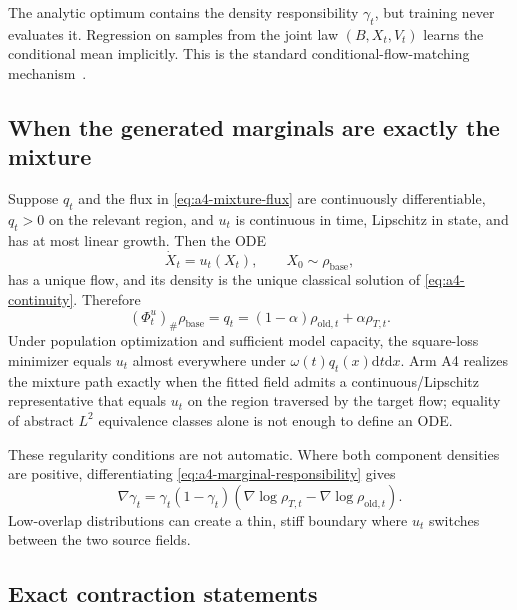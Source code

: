 \documentclass[11pt,a4paper]{article}
\newcommand{\dd}{\mathrm{d}}
\theoremstyle{plain}
\theoremstyle{definition}
\begin{document}
The analytic optimum contains the density responsibility $\gamma_t$, but training never evaluates
it.  Regression on samples from the joint law $(B,X_t,V_t)$ learns the conditional mean
implicitly.  This is the standard conditional-flow-matching mechanism~\cite{flowmatching}.

\subsection{When the generated marginals are exactly the mixture}

Suppose $q_t$ and the flux in \eqref{eq:a4-mixture-flux} are continuously differentiable, $q_t>0$
on the relevant region, and $u_t$ is continuous in time, Lipschitz in state, and has at most
linear growth.  Then the ODE
\begin{equation}
\dot X_t=u_t(X_t),
\qquad
X_0\sim\rho_{\mathrm{base}},
\label{eq:a4-target-ode}
\end{equation}
has a unique flow, and its density is the unique classical solution of
\eqref{eq:a4-continuity}.  Therefore
\begin{equation}
(\Phi_t^u)_\#\rho_{\mathrm{base}}=q_t
=(1-\alpha)\rho_{\mathrm{old},t}+\alpha\rho_{T,t}.
\label{eq:a4-exact-marginals}
\end{equation}
Under population optimization and sufficient model capacity, the square-loss minimizer equals
$u_t$ almost everywhere under $\omega(t)q_t(x)\dd t\dd x$.  Arm A4 realizes the mixture path
exactly when the fitted field admits a continuous/Lipschitz representative that equals $u_t$ on
the region traversed by the target flow; equality of abstract $L^2$ equivalence classes alone is
not enough to define an ODE.

These regularity conditions are not automatic.  Where both component densities are positive,
differentiating \eqref{eq:a4-marginal-responsibility} gives
\begin{equation}
\nabla\gamma_t
=
\gamma_t(1-\gamma_t)
\left(
  \nabla\log\rho_{T,t}
  -\nabla\log\rho_{\mathrm{old},t}
\right).
\label{eq:a4-gamma-gradient}
\end{equation}
Low-overlap distributions can create a thin, stiff boundary where $u_t$ switches between the two
source fields.

\subsection{Exact contraction statements}
\end{document}
